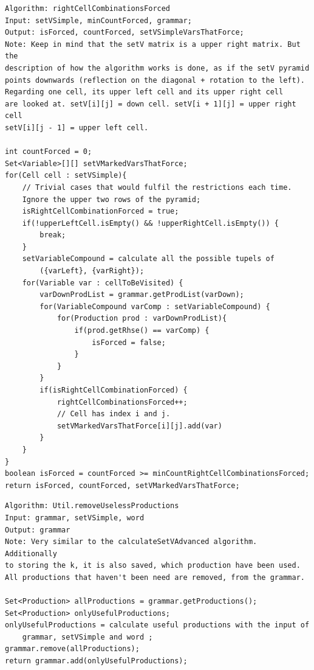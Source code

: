 \lstset{language=java}
\begin{lstlisting}[frame=htrbl, caption={rightCellCombinationsForced}, 
label={lst:rightCellCombinationsForced}]
Algorithm: rightCellCombinationsForced
Input: setVSimple, minCountForced, grammar;
Output: isForced, countForced, setVSimpleVarsThatForce;
Note: Keep in mind that the setV matrix is a upper right matrix. But the
description of how the algorithm works is done, as if the setV pyramid 
points downwards (reflection on the diagonal + rotation to the left).
Regarding one cell, its upper left cell and its upper right cell 
are looked at. setV[i][j] = down cell. setV[i + 1][j] = upper right cell
setV[i][j - 1] = upper left cell.

int countForced = 0;
Set<Variable>[][] setVMarkedVarsThatForce;
for(Cell cell : setVSimple){
	// Trivial cases that would fulfil the restrictions each time. 
	Ignore the upper two rows of the pyramid; 
	isRightCellCombinationForced = true;
	if(!upperLeftCell.isEmpty() && !upperRightCell.isEmpty()) {
		break;
	}
	setVariableCompound = calculate all the possible tupels of 
		({varLeft}, {varRight});
	for(Variable var : cellToBeVisited) {
		varDownProdList = grammar.getProdList(varDown);
		for(VariableCompound varComp : setVariableCompound) {
			for(Production prod : varDownProdList){
				if(prod.getRhse() == varComp) {
					isForced = false;
				}
			}
		}
		if(isRightCellCombinationForced) {
			rightCellCombinationsForced++;
			// Cell has index i and j.
			setVMarkedVarsThatForce[i][j].add(var)
		}
	}
}
boolean isForced = countForced >= minCountRightCellCombinationsForced;
return isForced, countForced, setVMarkedVarsThatForce;
\end{lstlisting}

\pagebreak

\lstset{language=java}
\begin{lstlisting}[frame=htrbl, caption={Util.removeUselessProductions}, 
label={lst:Util.removeUselessProductions}]
Algorithm: Util.removeUselessProductions
Input: grammar, setVSimple, word
Output: grammar
Note: Very similar to the calculateSetVAdvanced algorithm. Additionally
to storing the k, it is also saved, which production have been used. 
All productions that haven't been need are removed, from the grammar.

Set<Production> allProductions = grammar.getProductions();
Set<Production> onlyUsefulProductions;
onlyUsefulProductions = calculate useful productions with the input of
	grammar, setVSimple and word ;
grammar.remove(allProductions);
return grammar.add(onlyUsefulProductions);
\end{lstlisting}

\pagebreak